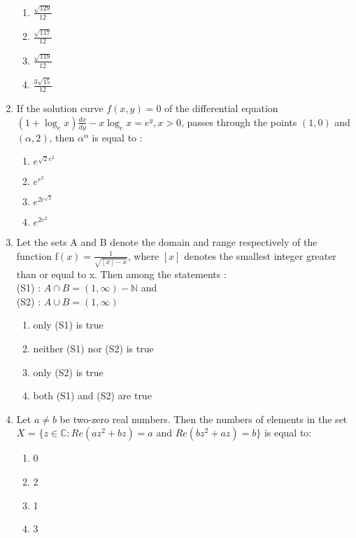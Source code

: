 \documentclass[journal,12pt,onecolumn]{IEEEtran}
\theoremstyle{remark}
\begin{document}
\begin{enumerate}
\begin{enumerate}
        \item $\frac{\sqrt{129}}{12}$ 
        \item $\frac{\sqrt{117}}{12}$
 \item $\frac{\sqrt{119}}{12}$ 
        \item $\frac{3\sqrt{15}}{12}$
\end{enumerate}
\item If the solution curve $f(x, y) = 0$ of the differential equation $(1+ \log_e x)\frac{dx}{dy} - x \log_e x =e^y, x>0$, passes through the points $(1, 0)$ and $(\alpha,2)$, then $\alpha ^{\alpha}$ is equal to :
        \begin{enumerate}
                \item $e^{\sqrt{2}e^2}$
                \item $e^{e^2}$
                \item $e^{2e^{\sqrt{2}}}$ 
        \item $e^{2e^2}$    
\end{enumerate}
\item Let the sets A and B denote the domain and range respectively of the function f$(x)=\frac{1}{\sqrt{[x]-x}}$, where $[x]$ denotes the smallest integer greater than or equal to x. Then among the statements :\\
(S1) : $A \cap B = (1,\infty) - \mathbb{N}$ and \\
(S2) : $A \cup B = (1,\infty)$
 \begin{enumerate}
                \item only (S1) is true
                \item neither (S1) nor (S2) is true
                \item only (S2) is true
                \item both (S1) and (S2) are true
\end{enumerate}
\item Let $a \neq b$ be two-zero real numbers. Then the numbers of elements in the set \\ $X$ = $\{$$z \in \mathbb{C}:Re(az^2+bz)=a$  and $Re(bz^2+az)=b$$\}$ is equal to:
\begin{enumerate}
                \item 0
                \item 2
                \item 1
                \item 3
\end{enumerate}
 \end{enumerate}
\end{document}
